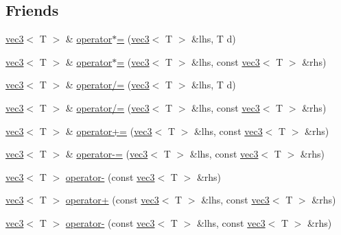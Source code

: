 \subsection*{Friends}
\begin{CompactItemize}
\item 
\hyperlink{classnv_1_1vec3}{vec3}$<$ T $>$ \& \hyperlink{classnv_1_1vec3_573e32ced446f83232eba6e5ea05861b}{operator$\ast$=} (\hyperlink{classnv_1_1vec3}{vec3}$<$ T $>$ \&lhs, T d)
\item 
\hyperlink{classnv_1_1vec3}{vec3}$<$ T $>$ \& \hyperlink{classnv_1_1vec3_d31ba8e621bcfefb698bcd943f2c3a68}{operator$\ast$=} (\hyperlink{classnv_1_1vec3}{vec3}$<$ T $>$ \&lhs, const \hyperlink{classnv_1_1vec3}{vec3}$<$ T $>$ \&rhs)
\item 
\hyperlink{classnv_1_1vec3}{vec3}$<$ T $>$ \& \hyperlink{classnv_1_1vec3_844bafa4fa80f32b5a32ab17950f5485}{operator/=} (\hyperlink{classnv_1_1vec3}{vec3}$<$ T $>$ \&lhs, T d)
\item 
\hyperlink{classnv_1_1vec3}{vec3}$<$ T $>$ \& \hyperlink{classnv_1_1vec3_8c22ebf703a1c1fe718cf72023ca948c}{operator/=} (\hyperlink{classnv_1_1vec3}{vec3}$<$ T $>$ \&lhs, const \hyperlink{classnv_1_1vec3}{vec3}$<$ T $>$ \&rhs)
\item 
\hyperlink{classnv_1_1vec3}{vec3}$<$ T $>$ \& \hyperlink{classnv_1_1vec3_303b24b77b45822f74d4a5fbcd5a9158}{operator+=} (\hyperlink{classnv_1_1vec3}{vec3}$<$ T $>$ \&lhs, const \hyperlink{classnv_1_1vec3}{vec3}$<$ T $>$ \&rhs)
\item 
\hyperlink{classnv_1_1vec3}{vec3}$<$ T $>$ \& \hyperlink{classnv_1_1vec3_06765bb69def0a8d02cb1fa99dfe6d64}{operator-=} (\hyperlink{classnv_1_1vec3}{vec3}$<$ T $>$ \&lhs, const \hyperlink{classnv_1_1vec3}{vec3}$<$ T $>$ \&rhs)
\item 
\hyperlink{classnv_1_1vec3}{vec3}$<$ T $>$ \hyperlink{classnv_1_1vec3_40e1814c396466ba80b3f31e41508134}{operator-} (const \hyperlink{classnv_1_1vec3}{vec3}$<$ T $>$ \&rhs)
\item 
\hyperlink{classnv_1_1vec3}{vec3}$<$ T $>$ \hyperlink{classnv_1_1vec3_8f8d95ac2a92eb4a9592592f08d25941}{operator+} (const \hyperlink{classnv_1_1vec3}{vec3}$<$ T $>$ \&lhs, const \hyperlink{classnv_1_1vec3}{vec3}$<$ T $>$ \&rhs)
\item 
\hyperlink{classnv_1_1vec3}{vec3}$<$ T $>$ \hyperlink{classnv_1_1vec3_f78147fab28f9a3a8c9edf28986e27da}{operator-} (const \hyperlink{classnv_1_1vec3}{vec3}$<$ T $>$ \&lhs, const \hyperlink{classnv_1_1vec3}{vec3}$<$ T $>$ \&rhs)
\item 

\end{CompactItemize}

